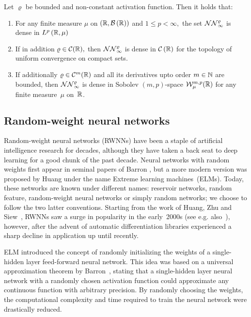 \begin{theorem}\label{thm:UAT}
Let $\varrho$ be bounded and
non-constant activation function. Then it holds that:
\begin{enumerate}
\item For any finite measure $\mu$ on $\left(\mathbb{R}, \mathcal{B}\left(\mathbb{R}\right)\right)$ and $1 \leq p<\infty,$ the set
$\mathcal{NN}_{\infty}^{\varrho}$ is dense in $L^{p}\left(\mathbb{R}, \mu\right)$
\item If in addition $\varrho \in \mathcal{C}(\mathbb{R}),$ then $\mathcal{NN}_{\infty}^{\varrho}$ is dense in $\mathcal{C}\left(\mathbb{R}\right)$ for the
topology of uniform convergence on compact sets.
\item If additionally $\varrho\in \mathcal{C}^m(\mathbb{R})$ and all its derivatives upto order $m\in\mathbb{N}$ are bounded, then $\mathcal{NN}_{\infty}^{\varrho}$ is dense in Sobolev $(m,p)$-space $\mathcal{W}^{m,p}_{\mu}(\mathbb{R})$ for any finite measure~$\mu$ on~$\mathbb{R}$.
\end{enumerate}
\end{theorem}

\subsection{Random-weight neural networks}\label{sec:RWNN}

Random-weight neural networks (RWNNs) have been a staple of artificial intelligence research for decades, although they have taken a back seat to deep learning for a good chunk of the past decade. Neural networks with random weights first appear in seminal papers of Barron \cite{Barron1992NeuralSystems, Barron1993UniversalFunction}, but a more modern version was proposed by Huang \cite{Huang2006UniversalNodes} under the name Extreme learning machines~(ELMs). Today, these networks are known under different names: reservoir networks, random feature, random-weight neural networks or simply random networks; we choose to follow the two latter conventions. Starting from the work of Huang, Zhu and Siew~\cite{Huang2006UniversalNodes}, RWNNs saw a surge in popularity in the early~2000s (see e.g. also~\cite{Rahimi2007RandomMachines, Rahimi2008WeightedLearning}), however, after the advent of automatic differentiation libraries experienced a sharp decline in application up until recently.

ELM introduced the concept of randomly initializing the weights of a single-hidden layer feed-forward neural network. This idea was based on a universal approximation theorem by Barron~\cite{Barron1993UniversalFunction}, stating that a single-hidden layer neural network with a randomly chosen activation function could approximate any continuous function with arbitrary precision. By randomly choosing the weights, the computational complexity and time required to train the neural network were drastically reduced.


